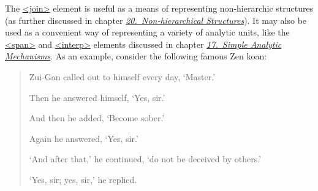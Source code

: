 The \hyperref[TEI.join]{<join>} element is useful as a means of representing non-hierarchic structures (as further discussed in chapter \textit{\hyperref[NH]{20.\ Non-hierarchical Structures}}). It may also be used as a convenient way of representing a variety of analytic units, like the \hyperref[TEI.span]{<span>} and \hyperref[TEI.interp]{<interp>} elements discussed in chapter \textit{\hyperref[AI]{17.\ Simple Analytic Mechanisms}}. As an example, consider the following famous Zen koan: 
\begin{quote}\par
Zui-Gan called out to himself every day, ‘Master.’ \par
Then he answered himself, ‘Yes, sir.’ \par
And then he added, ‘Become sober.’ \par
Again he answered, ‘Yes, sir.’ \par
‘And after that,’ he continued, ‘do not be deceived by others.’ \par
‘Yes, sir; yes, sir,’ he replied.\end{quote}
\par
